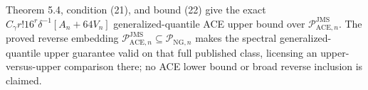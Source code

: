 Theorem 5.4, condition (21), and bound (22) give the exact \(C_{\gamma}r!16^r\delta^{-1}[A_n+64V_n]\) generalized-quantile ACE upper bound over \(\mathcal P_{\mathrm{ACE},n}^{\mathrm{JMS}}\). The proved reverse embedding \(\mathcal P_{\mathrm{ACE},n}^{\mathrm{JMS}}\subseteq\mathcal P_{\mathrm{NG},n}\) makes the spectral generalized-quantile upper guarantee valid on that full published class, licensing an upper-versus-upper comparison there; no ACE lower bound or broad reverse inclusion is claimed.